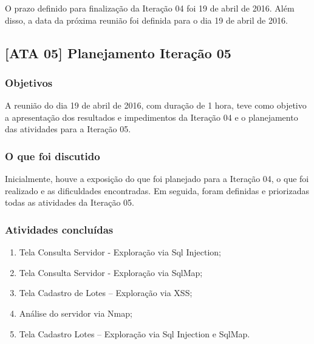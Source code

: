 \documentclass[
    12pt,               %
    openright,          %
    oneside,            %
    a4paper,            %
    section=TITLE,     %
    english,            %
    french,             %
    spanish,            %
    brazil              %
    ]{abntex2}
\begin{document}
O prazo definido para finalização da Iteração 04 foi 19 de abril de 2016. Além disso, a data da próxima reunião foi definida para o dia 19 de abril de 2016.



\subsection*{{[}ATA 05{]} Planejamento Iteração 05}


\subsubsection*{Objetivos}

A reunião do dia 19 de abril de 2016, com duração de 1 hora, teve como objetivo a apresentação dos resultados e impedimentos da Iteração 04 e o planejamento das atividades para a Iteração 05.



\subsubsection*{O que foi discutido}

Inicialmente, houve a exposição do que foi planejado para a Iteração 04, o que foi realizado e as dificuldades encontradas. Em seguida, foram definidas e priorizadas todas as atividades da Iteração 05.



\subsubsection*{Atividades concluídas}


\begin{enumerate}[start=1]
	
\item Tela Consulta Servidor - Exploração via Sql Injection;
	
\item Tela Consulta Servidor - Exploração via SqlMap;
	
\item Tela Cadastro de Lotes -- Exploração via XSS;
	
\item Análise do servidor via Nmap;
	
\item Tela Cadastro Lotes -- Exploração via Sql Injection e SqlMap.

\end{enumerate}
\end{document}
